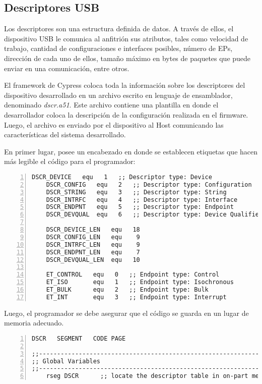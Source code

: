 \subsection{Descriptores USB}	
	Los descriptores son una estructura definida de datos. A través de ellos, el dispositivo USB le comunica al anfitrión sus atributos, tales como velocidad de trabajo, cantidad de configuraciones e interfaces posibles, número de EPs, dirección de cada uno de ellos, tamaño máximo en bytes de paquetes que puede enviar en una comunicación, entre otros.%
	
	El framework de Cypress coloca toda la información sobre los descriptores del dispositivo desarrollado en un archivo escrito en lenguaje de ensamblador, denominado {\it dscr.a51}. Este archivo contiene una plantilla en donde el desarrollador coloca la descripción de la configuración realizada en el firmware. Luego, el archivo es enviado por el dispositivo al Host comunicando las características del sistema desarrollado.%
	
	En primer lugar, posee un encabezado en donde se establecen etiquetas que hacen más legible el código para el programador:
	\begin{lstlisting}[language={[x86masm]Assembler},backgroundcolor=\color{gray!30},numbers=left]
	DSCR_DEVICE   equ   1   ;; Descriptor type: Device
	DSCR_CONFIG   equ   2   ;; Descriptor type: Configuration
	DSCR_STRING   equ   3   ;; Descriptor type: String
	DSCR_INTRFC   equ   4   ;; Descriptor type: Interface
	DSCR_ENDPNT   equ   5   ;; Descriptor type: Endpoint
	DSCR_DEVQUAL  equ   6   ;; Descriptor type: Device Qualifier
	
	DSCR_DEVICE_LEN   equ   18
	DSCR_CONFIG_LEN   equ    9
	DSCR_INTRFC_LEN   equ    9
	DSCR_ENDPNT_LEN   equ    7
	DSCR_DEVQUAL_LEN  equ   10
	
	ET_CONTROL   equ   0   ;; Endpoint type: Control
	ET_ISO       equ   1   ;; Endpoint type: Isochronous
	ET_BULK      equ   2   ;; Endpoint type: Bulk
	ET_INT       equ   3   ;; Endpoint type: Interrupt
	\end{lstlisting}

	Luego, el programador se debe asegurar que el código se guarda en un lugar de memoria adecuado.
	
	\begin{lstlisting}[language={[x86masm]Assembler},backgroundcolor=\color{gray!30},numbers=left]
DSCR   SEGMENT   CODE PAGE

;;-----------------------------------------------------------------------------
;; Global Variables
;;-----------------------------------------------------------------------------
	rseg DSCR      ;; locate the descriptor table in on-part memory.
	\end{lstlisting}
	
